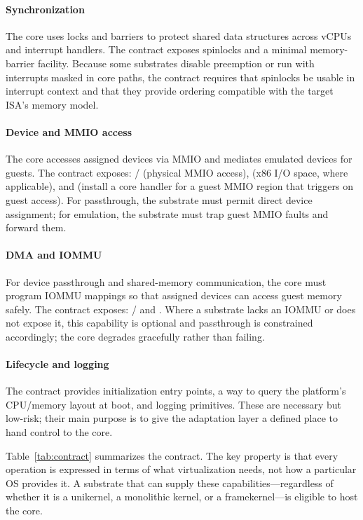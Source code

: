 \paragraph{Synchronization}
The core uses locks and barriers to protect shared data structures across vCPUs
and interrupt handlers. The contract exposes spinlocks and a minimal
memory-barrier facility. Because some substrates disable preemption or run with
interrupts masked in core paths, the contract requires that spinlocks be usable
in interrupt context and that they provide ordering compatible with the target
ISA's memory model.

\paragraph{Device and MMIO access}
The core accesses assigned devices via MMIO and mediates emulated devices for
guests. The contract exposes: / (physical
MMIO access),  (x86 I/O space, where applicable), and
 (install a core handler for a guest MMIO region
that triggers on guest access). For passthrough, the substrate must permit
direct device assignment; for emulation, the substrate must trap guest MMIO
faults and forward them.

\paragraph{DMA and IOMMU}
For device passthrough and shared-memory communication, the core must program
IOMMU mappings so that assigned devices can access guest memory safely. The
contract exposes: / and
. Where a substrate lacks an IOMMU or does not
expose it, this capability is optional and passthrough is constrained
accordingly; the core degrades gracefully rather than failing.

\paragraph{Lifecycle and logging}
The contract provides initialization entry points, a way to query the
platform's CPU/memory layout at boot, and logging primitives. These are
necessary but low-risk; their main purpose is to give the adaptation layer a
defined place to hand control to the core.

Table~\ref{tab:contract} summarizes the contract. The key property is that every
operation is expressed in terms of what virtualization needs, not how a
particular OS provides it. A substrate that can supply these
capabilities---regardless of whether it is a unikernel, a monolithic kernel, or
a framekernel---is eligible to host the core.

